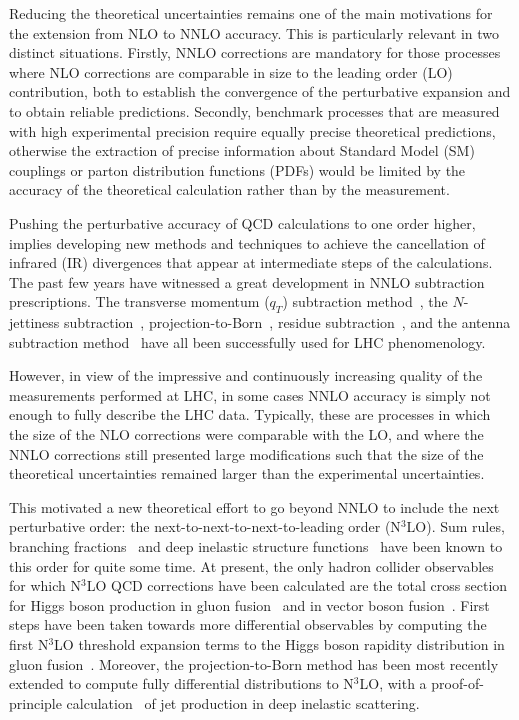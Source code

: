 \documentclass[12pt]{article}
\DeclareRobustCommand{\qt}{q_T}
\begin{document}
Reducing the theoretical uncertainties remains one of the main motivations for the extension from NLO to NNLO accuracy.  This is particularly relevant in two distinct situations. Firstly, NNLO corrections are mandatory for those processes where NLO corrections are comparable in size to the leading order (LO) contribution, both to establish the convergence of the perturbative expansion and to obtain reliable predictions. Secondly, benchmark processes that are measured with high experimental precision require equally precise theoretical predictions, otherwise the extraction of precise information about Standard Model (SM) couplings  or parton distribution functions (PDFs) would be limited by the accuracy of the theoretical calculation rather than by the measurement. 

Pushing the perturbative accuracy of QCD calculations to one order higher, implies developing new methods and techniques to achieve the cancellation of infrared (IR) divergences that appear at intermediate steps of the calculations. The past few years have witnessed a great development in NNLO subtraction prescriptions. The transverse momentum ($\qt$) subtraction method~\cite{Catani:2007vq,Bozzi:2005wk,Bonciani:2015sha}, the $N$-jettiness subtraction~\cite{Boughezal:2015eha, Gaunt:2015pea}, projection-to-Born~\cite{Cacciari:2015jma}, residue subtraction~\cite{Czakon:2011ve,Boughezal:2011jf}, and the antenna subtraction method~\cite{Antenna:method} have all been successfully used for LHC phenomenology. 

However, in view of the impressive and continuously increasing quality of the measurements performed at LHC, in some cases NNLO accuracy is simply not enough to fully describe the LHC data. Typically, these are processes in which the size of the NLO corrections were comparable with the LO, and where the NNLO corrections still presented large modifications such that the size of the theoretical uncertainties remained larger than the experimental uncertainties. 

This motivated a new theoretical effort to go beyond NNLO to include the next perturbative order: the next-to-next-to-next-to-leading order (N$^{3}$LO). Sum rules, branching fractions~\cite{Chetyrkin:1994js} and deep inelastic structure functions~\cite{Vermaseren:2005qc} have been known to this order for quite some time. At present, the only hadron collider observables for which N$^{3}$LO QCD corrections have been calculated are the total cross section for Higgs boson  production in gluon fusion~\cite{Anastasiou:2015ema,Mistlberger:2018etf} and in vector boson 
fusion~\cite{Dreyer:2016oyx}. First steps have been taken towards more differential observables by computing the first N$^{3}$LO threshold expansion terms to the Higgs boson rapidity distribution in gluon fusion~\cite{Dulat:2017prg}. Moreover, the projection-to-Born method has been most recently extended to compute fully differential distributions to N$^{3}$LO, with a proof-of-principle calculation~\cite{Currie:2018fgr} of jet production in deep inelastic scattering. 
\end{document}
